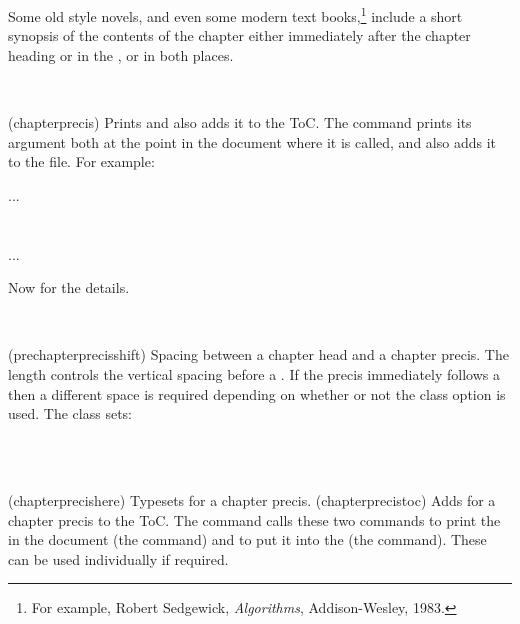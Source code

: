 

   Some old style novels, and even some modern text
 books,\footnote{For example, Robert Sedgewick, \textit{Algorithms},
 Addison-Wesley, 1983.} include a short synopsis of the contents of
 the chapter either immediately
 after the chapter heading or in the \toc, or in both places.

\begin{syntax}
\cmd{\chapterprecis} \\
\end{syntax}
\glossary(chapterprecis)%
  {}%
  {Prints  and also adds it to the ToC.}
     The command \cmd{\chapterprecis} prints its argument
 both at the
 point in the document where it is called, and also adds it to the 
 file. For example:
 \begin{lcode}
 ...
 \chapter{}%
 ...
 \end{lcode}

    Now for the details.

\begin{syntax}
\lnc{\prechapterprecisshift} \\
\end{syntax}
\glossary(prechapterprecisshift)%
  {}%
  {Spacing between a chapter head and a chapter precis.}
The length \lnc{\prechapterprecisshift} controls the vertical spacing before
a \cmd{\chapterprecis}. If the precis immediately follows a \cmd{\chapter}
then a different space is required depending on whether or not the
 class option is used. The class sets:
\begin{lcode}
\ifartopt
  \setlength{\prechapterprecisshift}{0pt}
\else
  \setlength{\prechapterprecisshift}{-2\baselineskip}
\fi
\end{lcode}


\begin{syntax}
\cmd{\chapterprecishere} \\
\cmd{\chapterprecistoc} \\
\end{syntax}
\glossary(chapterprecishere)%
  {}%
  {Typesets  for a chapter precis.}
\glossary(chapterprecistoc)%
  {}%
  {Adds  for a chapter precis to the ToC.}
 The \cmd{\chapterprecis} command calls these two commands to print the
  in the document (the \cmd{\chapterprecishere} command)
 and to put it into the \toc{} (the \cmd{\chapterprecistoc} command).
 These can be used individually if required.

